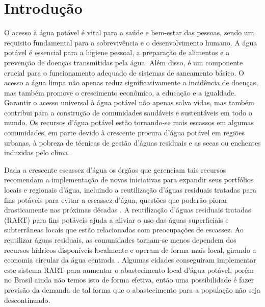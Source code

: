 


\section{Introdu{\c c}{\~a}o} \label{sec:int}


O acesso à água potável é vital para a saúde e bem-estar das pessoas, sendo um requisito fundamental para a sobrevivência e o desenvolvimento humano. A água potável é essencial para a higiene pessoal, a preparação de alimentos e a prevenção de doenças transmitidas pela água. Além disso, é um componente crucial para o funcionamento adequado de sistemas de saneamento básico. O acesso a água limpa não apenas reduz significativamente a incidência de doenças, mas também promove o crescimento econômico, a educação e a igualdade. Garantir o acesso universal à água potável não apenas salva vidas, mas também contribui para a construção de comunidades saudáveis e sustentáveis em todo o mundo. Os recursos d'água potável estão tornando-se mais escassos em algumas comunidades, em parte devido à crescente procura d'água potável em regiões urbanas, à pobreza de técnicas de gestão d'águas residuais e as secas ou enchentes induzidas pelo clima
\cite{10.2166/wp.2022.071}.

Dada a crescente escassez d'água os órgãos que gerenciam tais recursos recomendam a implementação de novas iniciativas para expandir seus portfólios locais e regionais d'água, incluindo a reutilização d'águas residuais tratadas para fins potáveis para evitar a escassez d'água, questões que poderão piorar drasticamente nas próximas décadas \cite{BARNES2023139587}. A reutilização d'águas residuais tratadas (RART) para fins potáveis ajuda a aliviar o uso das águas superficiais e subterrâneas locais que estão relacionadas com preocupações de escassez. Ao reutilizar águas residuais, as comunidades tornam-se menos dependem dos recursos hídricos disponíveis localmente e operam de forma mais local, girando a economia circular da água centrada \cite{TSATSOU2023136325}. Algumas cidades conseguiram implementar este sistema RART para aumentar o abastecimento local d'água potável, porém no Brasil ainda não temos isto de forma efetiva, então uma possibilidade é fazer previsão da demanda de tal forma que o abastecimento para a população não seja descontinuado. 

